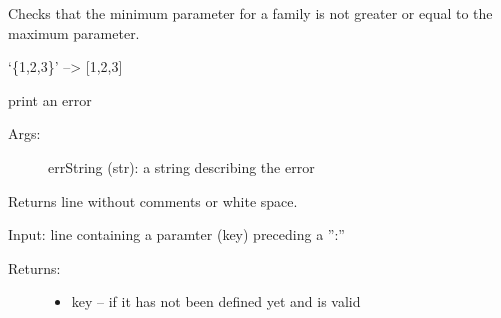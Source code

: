 \documentclass[letterpaper,10pt,english]{sphinxmanual}
\begin{document}
\begin{fulllineitems}
\begin{fulllineitems}
\end{fulllineitems}


\begin{fulllineitems}
\label{pydfnworks:pydfnworks.helper.input_helper.check_min_max}
Checks that the minimum parameter for a family is not greater or equal to the maximum parameter.

\end{fulllineitems}


\begin{fulllineitems}
\label{pydfnworks:pydfnworks.helper.input_helper.curly_to_list}
`\{1,2,3\}' --\textgreater{} {[}1,2,3{]}

\end{fulllineitems}


\begin{fulllineitems}
\label{pydfnworks:pydfnworks.helper.input_helper.error}
print an error
\begin{description}
\item[{Args:}] \leavevmode
errString (str): a string describing the error

\end{description}

\end{fulllineitems}


\begin{fulllineitems}
\label{pydfnworks:pydfnworks.helper.input_helper.extract_parameters}
Returns line without comments or white space.

\end{fulllineitems}


\begin{fulllineitems}
\label{pydfnworks:pydfnworks.helper.input_helper.find_key}
Input: line containing a paramter (key) preceding a '':''
\begin{description}
\item[{Returns: }] \leavevmode\begin{itemize}
\item {} 
key -- if it has not been defined yet and is valid


\end{itemize}
\end{description}
\end{fulllineitems}
\end{fulllineitems}
\end{document}
